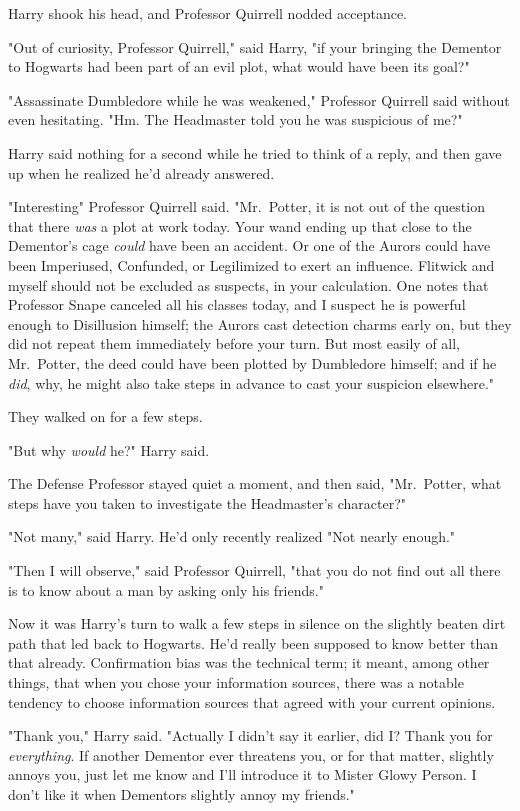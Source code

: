 Harry shook his head, and Professor Quirrell nodded acceptance.

"Out of curiosity, Professor Quirrell," said Harry, "if your bringing the
Dementor to Hogwarts had been part of an evil plot, what would have been its
goal?"

"Assassinate Dumbledore while he was weakened," Professor Quirrell said without
even hesitating. "Hm. The Headmaster told you he was suspicious of me?"

Harry said nothing for a second while he tried to think of a reply, and then
gave up when he realized he'd already answered.

"Interesting{\el}" Professor Quirrell said. "Mr.~Potter, it is not out of
the question that there \emph{was} a plot at work today. Your wand ending up
that close to the Dementor's cage \emph{could} have been an accident. Or one of
the Aurors could have been Imperiused, Confunded, or Legilimized to exert an
influence. Flitwick and myself should not be excluded as suspects, in your
calculation. One notes that Professor Snape canceled all his classes today, and
I suspect he is powerful enough to Disillusion himself; the Aurors cast
detection charms early on, but they did not repeat them immediately before your
turn. But most easily of all, Mr.~Potter, the deed could have been plotted by
Dumbledore himself; and if he \emph{did}, why, he might also take steps in
advance to cast your suspicion elsewhere."

They walked on for a few steps.

"But why \emph{would} he?" Harry said.

The Defense Professor stayed quiet a moment, and then said, "Mr.~Potter, what
steps have you taken to investigate the Headmaster's character?"

"Not many," said Harry. He'd only recently realized{\el} "Not nearly enough."

"Then I will observe," said Professor Quirrell, "that you do not find out all
there is to know about a man by asking only his friends."

Now it was Harry's turn to walk a few steps in silence on the slightly beaten
dirt path that led back to Hogwarts. He'd really been supposed to know better
than that already. Confirmation bias was the technical term; it meant, among
other things, that when you chose your information sources, there was a notable
tendency to choose information sources that agreed with your current opinions.

"Thank you," Harry said. "Actually{\el} I didn't say it earlier, did I?
Thank you for \emph{everything}. If another Dementor ever threatens you, or for
that matter, slightly annoys you, just let me know and I'll introduce it to
Mister Glowy Person. I don't like it when Dementors slightly annoy my friends."

